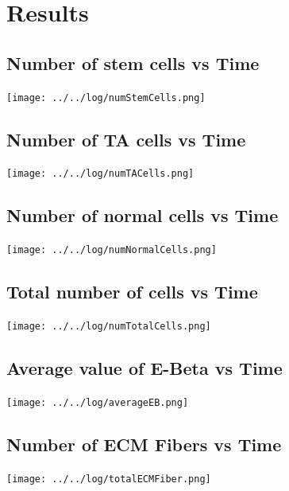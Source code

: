 \documentclass[11pt]{report}
\begin{document}
 \chapter{Results}
 \section{Number of stem cells vs Time}
 \texttt{[image: ../../log/numStemCells.png]}
 
 \section{Number of TA cells vs Time}
 \texttt{[image: ../../log/numTACells.png]}
 
 \section{Number of normal cells vs Time}
 \texttt{[image: ../../log/numNormalCells.png]}
 
 \section{Total number of cells vs Time}
 \texttt{[image: ../../log/numTotalCells.png]}
 
 \section{Average value of E-Beta vs Time}
 \texttt{[image: ../../log/averageEB.png]}
 
 \section{Number of ECM Fibers vs Time}
 \texttt{[image: ../../log/totalECMFiber.png]}


 
 
\end{document}

